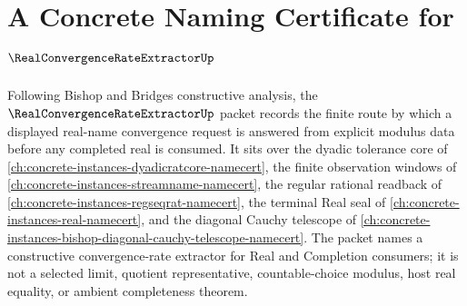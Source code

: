 \chapter{A Concrete Naming Certificate for $\RealConvergenceRateExtractorUp$}
\label{ch:concrete-instances-real-convergence-rate-extractor-namecert}

Following Bishop and Bridges constructive analysis, the $\RealConvergenceRateExtractorUp$ packet records the finite route by which a displayed real-name convergence request is answered from explicit modulus data before any completed real is consumed. It sits over the dyadic tolerance core of \autoref{ch:concrete-instances-dyadicratcore-namecert}, the finite observation windows of \autoref{ch:concrete-instances-streamname-namecert}, the regular rational readback of \autoref{ch:concrete-instances-regseqrat-namecert}, the terminal Real seal of \autoref{ch:concrete-instances-real-namecert}, and the diagonal Cauchy telescope of \autoref{ch:concrete-instances-bishop-diagonal-cauchy-telescope-namecert}. The packet names a constructive convergence-rate extractor for Real and Completion consumers; it is not a selected limit, quotient representative, countable-choice modulus, host real equality, or ambient completeness theorem.

